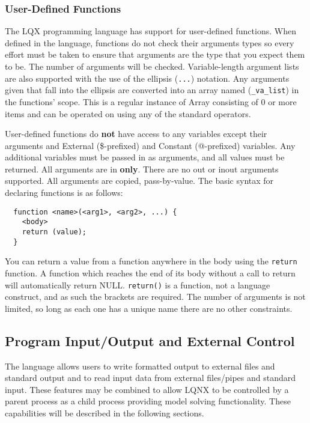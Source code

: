 \subsubsection{User-Defined Functions}

The LQX programming language has support for user-defined functions. When
defined in the language, functions do not check their arguments types so every
effort must be taken to ensure that arguments are the type that you expect them
to be. The number of arguments will be checked. Variable-length
argument lists are also supported with the use of the
ellipsis ({\tt ...}) notation. Any arguments given that fall into the ellipsis
are converted into an array named ({\tt \_va\_list}) in the functions' scope.
This is a regular instance of Array consisting of 0 or more items and can be
operated on using any of the standard operators.

User-defined functions do \textbf{not} have access to any variables except
their arguments and External (\$-prefixed) and Constant (@-prefixed) variables.
Any additional variables must be passed in as arguments, and all values must
be returned. All arguments are in \textbf{only}. There are no out or inout
arguments supported. All arguments are copied, pass-by-value. The basic syntax
for declaring functions is as follows:

\lstset{language=LQX}
\begin{lstlisting}
  function <name>(<arg1>, <arg2>, ...) {
    <body>
    return (value);
  }
\end{lstlisting}

You can return a value from a function anywhere in the body using the {\tt return}
function. A function which reaches the end of its body without a call to return will
automatically return NULL. {\tt return()} is a function, not a language construct,
and as such the brackets are required. The number of arguments is not limited,
so long as each one has a unique name there are no other constraints.

\subsection{Program Input/Output and External Control}

The \ModLang language allows users to write formatted output to external files and standard output and to read
input data from external files/pipes and standard input. These features may be combined to allow LQNX to be
controlled by a parent process as a child process providing model solving functionality. These capabilities will
be described in the following sections.

